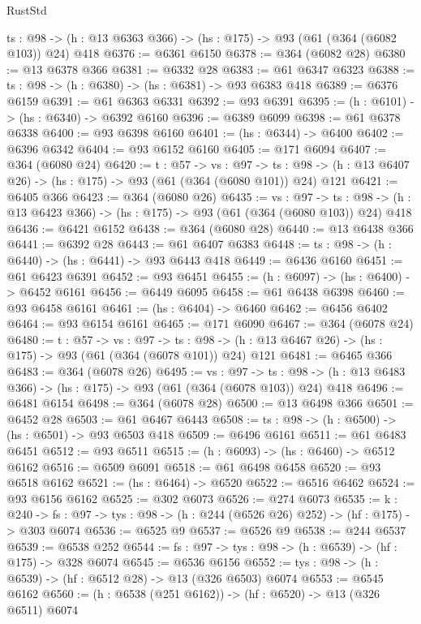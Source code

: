 \begin{lexlean}{RustStd}
\begin{coremodule}
  {ts : @98} -> (h : @13 @6363 @366) -> (hs : @175) -> @93 (@61 (@364 (@6082 @103)) @24) @418
@6376 := @6361 @6150
@6378 := @364 (@6082 @28)
@6380 := @13 @6378 @366
@6381 := @6332 @28
@6383 := @61 @6347 @6323
@6388 := {ts : @98} -> (h : @6380) -> (hs : @6381) -> @93 @6383 @418
@6389 := @6376 @6159
@6391 := @61 @6363 @6331
@6392 := @93 @6391
@6395 := (h : @6101) -> (hs : @6340) -> @6392 @6160
@6396 := @6389 @6099
@6398 := @61 @6378 @6338
@6400 := @93 @6398 @6160
@6401 := (hs : @6344) -> @6400
@6402 := @6396 @6342
@6404 := @93 @6152 @6160
@6405 := @171 @6094
@6407 := @364 (@6080 @24)
@6420 := {t : @57} ->
  {vs : @97} ->
  {ts : @98} -> (h : @13 @6407 @26) -> (hs : @175) -> @93 (@61 (@364 (@6080 @101)) @24) @121
@6421 := @6405 @366
@6423 := @364 (@6080 @26)
@6435 := {vs : @97} ->
  {ts : @98} -> (h : @13 @6423 @366) -> (hs : @175) -> @93 (@61 (@364 (@6080 @103)) @24) @418
@6436 := @6421 @6152
@6438 := @364 (@6080 @28)
@6440 := @13 @6438 @366
@6441 := @6392 @28
@6443 := @61 @6407 @6383
@6448 := {ts : @98} -> (h : @6440) -> (hs : @6441) -> @93 @6443 @418
@6449 := @6436 @6160
@6451 := @61 @6423 @6391
@6452 := @93 @6451
@6455 := (h : @6097) -> (hs : @6400) -> @6452 @6161
@6456 := @6449 @6095
@6458 := @61 @6438 @6398
@6460 := @93 @6458 @6161
@6461 := (hs : @6404) -> @6460
@6462 := @6456 @6402
@6464 := @93 @6154 @6161
@6465 := @171 @6090
@6467 := @364 (@6078 @24)
@6480 := {t : @57} ->
  {vs : @97} ->
  {ts : @98} -> (h : @13 @6467 @26) -> (hs : @175) -> @93 (@61 (@364 (@6078 @101)) @24) @121
@6481 := @6465 @366
@6483 := @364 (@6078 @26)
@6495 := {vs : @97} ->
  {ts : @98} -> (h : @13 @6483 @366) -> (hs : @175) -> @93 (@61 (@364 (@6078 @103)) @24) @418
@6496 := @6481 @6154
@6498 := @364 (@6078 @28)
@6500 := @13 @6498 @366
@6501 := @6452 @28
@6503 := @61 @6467 @6443
@6508 := {ts : @98} -> (h : @6500) -> (hs : @6501) -> @93 @6503 @418
@6509 := @6496 @6161
@6511 := @61 @6483 @6451
@6512 := @93 @6511
@6515 := (h : @6093) -> (hs : @6460) -> @6512 @6162
@6516 := @6509 @6091
@6518 := @61 @6498 @6458
@6520 := @93 @6518 @6162
@6521 := (hs : @6464) -> @6520
@6522 := @6516 @6462
@6524 := @93 @6156 @6162
@6525 := @302 @6073
@6526 := @274 @6073
@6535 := {k : @240} ->
  {fs : @97} -> {tys : @98} -> (h : @244 (@6526 @26) @252) -> (hf : @175) -> @303 @6074
@6536 := @6525 @9
@6537 := @6526 @9
@6538 := @244 @6537
@6539 := @6538 @252
@6544 := {fs : @97} -> {tys : @98} -> (h : @6539) -> (hf : @175) -> @328 @6074
@6545 := @6536 @6156
@6552 := {tys : @98} -> (h : @6539) -> (hf : @6512 @28) -> @13 (@326 @6503) @6074
@6553 := @6545 @6162
@6560 := (h : @6538 (@251 @6162)) -> (hf : @6520) -> @13 (@326 @6511) @6074

\end{coremodule}
\end{lexlean}
